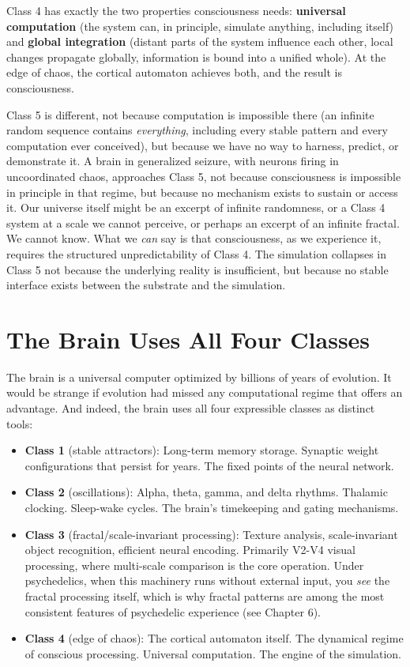 \documentclass[11pt, twoside, openright]{book}
\begin{document}
Class 4 has exactly the two properties consciousness needs: \textbf{universal computation} (the system can, in principle, simulate anything, including itself) and \textbf{global integration} (distant parts of the system influence each other, local changes propagate globally, information is bound into a unified whole). At the edge of chaos, the cortical automaton achieves both, and the result is consciousness.

Class 5 is different, not because computation is impossible there (an infinite random sequence contains \textit{everything}, including every stable pattern and every computation ever conceived), but because we have no way to harness, predict, or demonstrate it. A brain in generalized seizure, with neurons firing in uncoordinated chaos, approaches Class 5, not because consciousness is impossible in principle in that regime, but because no mechanism exists to sustain or access it. Our universe itself might be an excerpt of infinite randomness, or a Class 4 system at a scale we cannot perceive, or perhaps an excerpt of an infinite fractal. We cannot know. What we \textit{can} say is that consciousness, as we experience it, requires the structured unpredictability of Class 4. The simulation collapses in Class 5 not because the underlying reality is insufficient, but because no stable interface exists between the substrate and the simulation.

\section*{The Brain Uses All Four Classes}

The brain is a universal computer optimized by billions of years of evolution. It would be strange if evolution had missed any computational regime that offers an advantage. And indeed, the brain uses all four expressible classes as distinct tools:

\begin{itemize}
  \item \textbf{Class 1} (stable attractors): Long-term memory storage. Synaptic weight configurations that persist for years. The fixed points of the neural network.
  \item \textbf{Class 2} (oscillations): Alpha, theta, gamma, and delta rhythms. Thalamic clocking. Sleep-wake cycles. The brain's timekeeping and gating mechanisms.
  \item \textbf{Class 3} (fractal/scale-invariant processing): Texture analysis, scale-invariant object recognition, efficient neural encoding. Primarily V2-V4 visual processing, where multi-scale comparison is the core operation. Under psychedelics, when this machinery runs without external input, you \textit{see} the fractal processing itself, which is why fractal patterns are among the most consistent features of psychedelic experience (see Chapter 6).
  \item \textbf{Class 4} (edge of chaos): The cortical automaton itself. The dynamical regime of conscious processing. Universal computation. The engine of the simulation.
\end{itemize}
\end{document}
